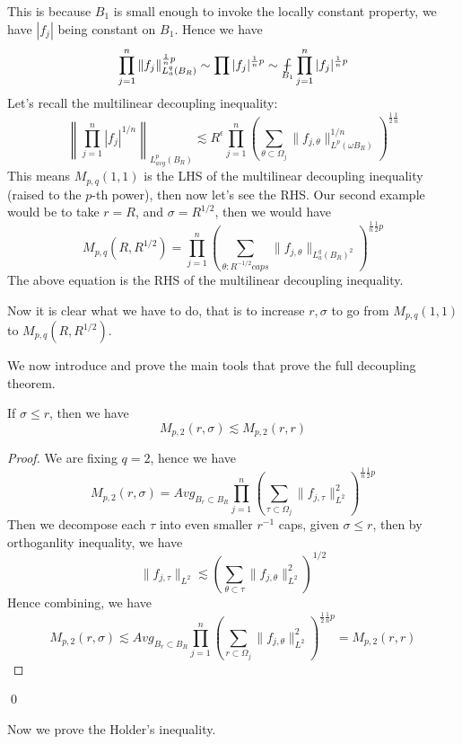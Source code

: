 This is because $B_1$ is small enough to invoke the locally constant property, we have $|f_j|$ being constant on $B_1$. Hence we have
\begin{equation*}
    \prod_{j=1}^n\|f_j\|_{L_a^q(B_R)}^{\frac{1}{n}p}\sim\prod |f_j|^{\frac{1}{n}p}\sim\avint_{B_1}\prod_{j=1}^n|f_j|^{\frac{1}{n}p}
\end{equation*}
Let's recall the multilinear decoupling inequality:
\begin{equation*}
    \left\|\prod_{j=1}^n|f_j|^{1/n} \right\|_{L_{avg}^p(B_R)}\lesssim R^\epsilon\prod_{j=1}^n\left(\sum_{\theta\subset\Omega_j}\|f_{j,\theta}\|_{L^p(\omega B_R)}^{1/n} \right)^{\frac{1}{2}\frac{1}{n}}
\end{equation*}
This means $M_{p,q}(1,1)$ is the LHS of the multilinear decoupling inequality (raised to the $p$-th power), then now let's see the RHS. Our second example would be to take $r=R$, and $\sigma=R^{1/2}$, then we would have
\begin{equation*}
    M_{p,q}(R,R^{1/2})=\prod_{j=1}^n\left(\sum_{\theta:R^{-1/2}caps}\|f_{j,\theta}\|_{L_a^q(B_R)^2} \right)^{\frac{1}{n}\frac{1}{2}p}
\end{equation*}
The above equation is the RHS of the multilinear decoupling inequality.

Now it is clear what we have to do, that is to increase $r,\sigma$ to go from $M_{p,q}(1,1)$ to $M_{p,q}(R, R^{1/2})$.

We now introduce and prove the main tools that prove the full decoupling theorem.
\begin{lemma}[Orthoganlity]
    If $\sigma\leq r$, then we have
    \begin{equation*}
        M_{p,2}(r,\sigma)\lesssim M_{p,2}(r,r)
    \end{equation*}
\end{lemma}
\begin{proof}
    We are fixing $q=2$, hence we have
    \begin{equation*}
        M_{p,2}(r,\sigma)=Avg_{B_r\subset B_R}\prod_{j=1}^n\left(\sum_{\tau\subset\Omega_j}\|f_{j,\tau}\|_{L^2}^2\right)^{\frac{1}{n}\frac{1}{2}p}
    \end{equation*}
    Then we decompose each $\tau$ into even smaller $r^{-1}$ caps, given $\sigma\leq r$, then by orthoganlity inequality, we have
    \begin{equation*}
        \|f_{j,\tau}\|_{L^2}\lesssim \left(\sum_{\theta\subset\tau}\|f_{j,\theta}\|_{L^2}^2 \right)^{1/2}
    \end{equation*}
    Hence combining, we have
    \begin{equation*}
        M_{p,2}(r,\sigma)\lesssim Avg_{B_r\subset B_R}\prod_{j=1}^n\left(\sum_{r\subset\Omega_j}\|f_{j,\theta}\|_{L^2}^2 \right)^{\frac{1}{2}\frac{1}{n}p}=M_{p,2}(r,r)
    \end{equation*}
\end{proof}
\qed


Now we prove the Holder's inequality.